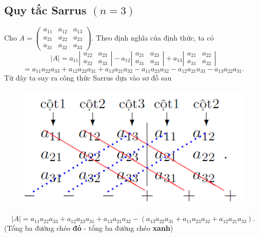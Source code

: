 \subsection{Quy tắc Sarrus $\left( {n = 3} \right)$}
Cho $A = \left( {\begin{array}{*{20}{c}}
  {{a_{11}}}&{{a_{12}}}&{{a_{13}}} \\ 
  {{a_{21}}}&{{a_{22}}}&{{a_{23}}} \\ 
  {{a_{31}}}&{{a_{32}}}&{{a_{33}}} 
\end{array}} \right).$ Theo định nghĩa của định thức, ta có
$$\left| A \right| = {a_{11}}\left| {\begin{array}{*{20}{c}}
  {{a_{22}}}&{{a_{23}}} \\ 
  {{a_{32}}}&{{a_{33}}} 
\end{array}} \right| - {a_{12}}\left| {\begin{array}{*{20}{c}}
  {{a_{21}}}&{{a_{23}}} \\ 
  {{a_{31}}}&{{a_{33}}} 
\end{array}} \right| + {a_{13}}\left| {\begin{array}{*{20}{c}}
  {{a_{21}}}&{{a_{22}}} \\ 
  {{a_{31}}}&{{a_{32}}} 
\end{array}} \right|$$
$$ = {a_{11}}{a_{22}}{a_{33}} + {a_{12}}{a_{23}}{a_{31}} + {a_{13}}{a_{21}}{a_{32}} - {a_{11}}{a_{23}}{a_{32}} - {a_{12}}{a_{21}}{a_{33}} - {a_{13}}{a_{22}}{a_{31}}.$$
Từ đây ta suy ra công thức Sarrus dựa vào sơ đồ sau
\begin{figure}[H]
\begin{center}
\includegraphics[scale=0.8]{C2_1}
\end{center}
\end{figure}
$$\left| A \right| = {a_{11}}{a_{22}}{a_{33}} + {a_{12}}{a_{23}}{a_{31}} + {a_{13}}{a_{21}}{a_{32}} - \left( {{a_{13}}{a_{22}}{a_{31}} + {a_{11}}{a_{23}}{a_{32}} + {a_{12}}{a_{21}}{a_{33}}} \right).$$
(Tổng ba đường chéo \textbf{đỏ} - tổng ba đường chéo \textbf{xanh})

